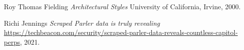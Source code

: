 \begin{thebibliography}{9}

Roy Thomas Fielding
\textit{Architectural Styles}
University of California, Irvine, 2000.

Richi Jennings
\textit{Scraped Parler data is truly revealing}
\url{https://techbeacon.com/security/scraped-parler-data-reveals-countless-capitol-perps}, 2021.

\end{thebibliography}
